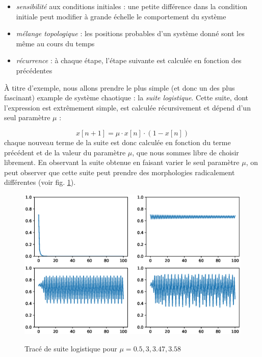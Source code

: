 \documentclass[12pt,a4paper]{article}
\begin{document}
\begin{itemize}
\item \textit{sensibilité} aux conditions initiales : une petite différence dans la condition initiale peut modifier à grande échelle le comportement du système
\item \textit{mélange topologique} : les positions probables d'un système donné sont les même au cours du temps
\item \textit{récurrence} : à chaque étape, l'étape suivante est calculée en fonction des précédentes \\
\end{itemize}

À titre d'exemple, nous allons prendre le plus simple (et donc un des plus fascinant) example de système chaotique : la \textit{suite logistique}. Cette suite, dont l'expression est extrêmement simple, est calculée récursivement et dépend d'un seul paramètre $\mu$ :

\[
x[n+1] = \mu \cdot x[n] \cdot ( 1 - x[n])
\]
chaque nouveau terme de la suite est donc calculée en fonction du terme précédent et de la valeur du paramètre $\mu$, que nous sommes libre de choisir librement. En observant la suite obtenue en faisant varier le seul paramètre $\mu$, on peut observer que cette suite peut prendre des morphologies radicalement différentes (voir fig. \ref{logistic}).\\

\begin{figure}
\begin{center}
\label{logistic}
\includegraphics[scale=0.5]{medias/logistic_figs.eps}
\caption{Tracé de suite logistique pour $\mu = 0.5, 3, 3.47, 3.58$}
\end{center}
\end{figure}
\end{document}
